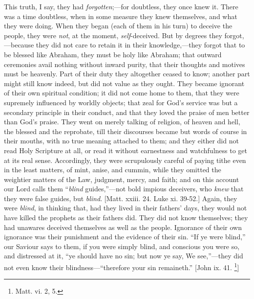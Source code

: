 This truth, I say, they had \emph{forgotten};—for
doubtless, they once knew it. There was a time doubtless,
when in some measure they knew themselves, and what they
were doing. When they began (each of them in his turn) to
deceive the people, they were \emph{not}, at the moment, \emph{self}-deceived.
But by degrees they forgot,—because they did not
care to retain it in their knowledge,—they forgot
that to be blessed like Abraham, they must be holy like
Abraham; that outward ceremonies avail nothing without
inward purity, that their thoughts and motives must be
heavenly. Part of their duty they altogether ceased to
know; another part might still know indeed, but did not
value as they ought. They became ignorant of their own
spiritual condition; it did not come home to them, that
they were supremely influenced by worldly objects; that
zeal for God's service was but a secondary principle in
their conduct, and that they loved the praise of men
better than God's praise. They went on merely talking of
religion, of heaven and hell, the blessed and the
reprobate, till their discourses became but words of
course in their mouths, with no true meaning attached to
them; and they either did not read Holy Scripture at all,
or read it without earnestness and watchfulness to get at
its real sense. Accordingly, they were scrupulously
careful of paying tithe even in the least matters, of
mint, anise, and cummin, while they omitted the weightier
matters of the Law, judgment, mercy, and faith; and on
this account our Lord calls them ``\emph{blind}
guides,''—not bold impious deceivers, who \emph{knew}
that they were false guides, but \emph{blind}. [Matt.
xxiii. 24. Luke xi. 39-52.] Again, they were \emph{blind},
in thinking that, had they lived in their fathers' days,
they would not have killed the prophets as their fathers
did. They did not know themselves; they had unawares
deceived themselves as well as the people. Ignorance of
their own ignorance was their punishment and the evidence
of their sin. ``If ye were blind,'' our Saviour
says to them, if you were simply blind, and conscious you
were so, and distressed at it, ``ye should have no
sin; but now ye say, We see,''—they did not even
know their blindness—``therefore your sin
remaineth.'' [John ix. 41. \footnote{Matt. vi. 2, 5.}]

